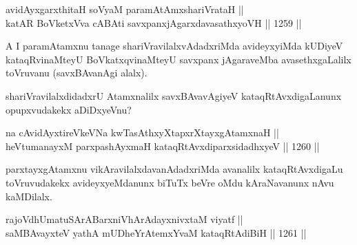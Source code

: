
\begin{shl}
avidAyxgarxthitaH soV\s yaM paramAtAmx\s shariVrataH || \\
katAR BoVketxVva cA\s \s BAti savxpanxjAgarxdavasathxyoVH \hfill || 1259 ||  
\end{shl}

\begin{artha}
A I paramAtamxnu tanage shariVravilalxvAdadxriMda avideyxyiMda kUDiyeV kataqRvinaMteyU BoVkatxqvinaMteyU savxpanx jAgaraveMba avasethxgaLalilx toVruvanu (savxBAvanAgi alalx).
\end{artha}

\begin{artha}
shariVravilalxdidadxrU Atamxnalilx savxBAvavAgiyeV kataqRtAvxdigaLanunx opupxvudakekx aDiDxyeVnu?
\end{artha}

\begin{shl}
na cAvidAyxtireVkeVNa kwTasAthxyXtapxrXtayxgAtamxnaH || \\
heVtumanayxM parxpashAyxmaH kataqRtAvxdiparxsidadhxyeV \hfill || 1260 ||  
\end{shl}

\begin{artha}
parxtayxgAtamxnu vikAravilalxdavanAdadxriMda avanalilx kataqRtAvxdigaLu toVruvudakekx avideyxyeMdanunx biTuTx beVre oMdu kAraNavanunx nAvu kaMDilalx.
\end{artha}


\begin{shl}
rajoVdhUmatuSArABarx\footnotemark[1]niVhArAdayxnivxtaM viyatf || \\
saMBAvayxteV yathA mUDheYrAtemxYvaM kataqRtAdiBiH \hfill || 1261 ||  
\end{shl}	

